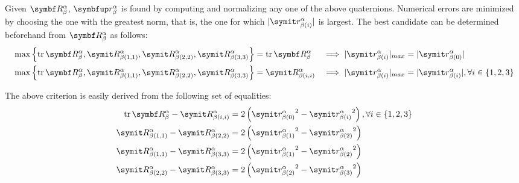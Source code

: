 Given $\RotM{\alpha}{\beta}$, $\RotQ{\alpha}{\beta}$ is found by computing and normalizing any one of the above quaternions. Numerical errors are minimized by choosing the one with the greatest norm, that is, the one for which $|\cRotQ{\alpha}{\beta}{i}|$ is largest. The best candidate can be determined beforehand from $\RotM{\alpha}{\beta}$ as follows:
\begin{alignat*}{2}
	\max \left\{ \trace{\RotM{\alpha}{\beta}}, \cRotM{\alpha}{\beta}{1,1}, \cRotM{\alpha}{\beta}{2,2}, \cRotM{\alpha}{\beta}{3,3}  \right\} &= \trace{\RotM{\alpha}{\beta}} & \implies |\cRotQ{\alpha}{\beta}{i}|_{max} &= |\cRotQ{\alpha}{\beta}{0}| \\
	\max \left\{ \trace{\RotM{\alpha}{\beta}}, \cRotM{\alpha}{\beta}{1,1}, \cRotM{\alpha}{\beta}{2,2}, \cRotM{\alpha}{\beta}{3,3}  \right\} &= \cRotM{\alpha}{\beta}{i,i} & \implies |\cRotQ{\alpha}{\beta}{i}|_{max} &= |\cRotQ{\alpha}{\beta}{i}|, \forall i \in \left\{ 1,2,3\right\}
\end{alignat*}

The above criterion is easily derived from the following set of equalities:
\begin{align*}
	\trace{\RotM{\alpha}{\beta}} - \cRotM{\alpha}{\beta}{i,i} &= 2 \left( {\cRotQ{\alpha}{\beta}{0}}^2 - {\cRotQ{\alpha}{\beta}{i}}^2 \right), \forall i \in \left\{ 1,2,3\right\} \\
	\cRotM{\alpha}{\beta}{1,1} - \cRotM{\alpha}{\beta}{2,2}   &= 2 \left( {\cRotQ{\alpha}{\beta}{1}}^2 - {\cRotQ{\alpha}{\beta}{2}}^2 \right)\\
	\cRotM{\alpha}{\beta}{1,1} - \cRotM{\alpha}{\beta}{3,3}   &= 2 \left( {\cRotQ{\alpha}{\beta}{1}}^2 - {\cRotQ{\alpha}{\beta}{2}}^2 \right) \\
	\cRotM{\alpha}{\beta}{2,2} - \cRotM{\alpha}{\beta}{3,3}   &= 2 \left( {\cRotQ{\alpha}{\beta}{2}}^2 - {\cRotQ{\alpha}{\beta}{3}}^2 \right)
\end{align*}

